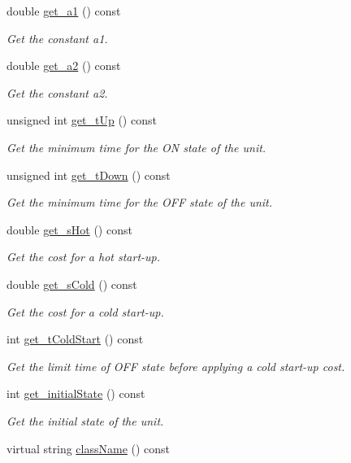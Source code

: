 \begin{DoxyCompactItemize}
double \hyperlink{classeo_u_c_p_unit_a15179a045115082ea193f84cf1c0e971}{get\-\_\-a1} () const 
\begin{DoxyCompactList}\small\item\em \-Get the constant a1. \end{DoxyCompactList}\item 
double \hyperlink{classeo_u_c_p_unit_ac3ea9f83d31ecfca1dcba23d8e4c4f5f}{get\-\_\-a2} () const 
\begin{DoxyCompactList}\small\item\em \-Get the constant a2. \end{DoxyCompactList}\item 
unsigned int \hyperlink{classeo_u_c_p_unit_a0e23ba3e0c819cb5b5031d6d66f37faa}{get\-\_\-t\-Up} () const 
\begin{DoxyCompactList}\small\item\em \-Get the minimum time for the \-O\-N state of the unit. \end{DoxyCompactList}\item 
unsigned int \hyperlink{classeo_u_c_p_unit_a0ab14d553bf956db211fe1a090b687de}{get\-\_\-t\-Down} () const 
\begin{DoxyCompactList}\small\item\em \-Get the minimum time for the \-O\-F\-F state of the unit. \end{DoxyCompactList}\item 
double \hyperlink{classeo_u_c_p_unit_a4a92d564ff6e5fb629a4d2d137dc94fd}{get\-\_\-s\-Hot} () const 
\begin{DoxyCompactList}\small\item\em \-Get the cost for a hot start-\/up. \end{DoxyCompactList}\item 
double \hyperlink{classeo_u_c_p_unit_a858ce079554ef41c13390b01080ced87}{get\-\_\-s\-Cold} () const 
\begin{DoxyCompactList}\small\item\em \-Get the cost for a cold start-\/up. \end{DoxyCompactList}\item 
int \hyperlink{classeo_u_c_p_unit_a38d487e42d5650b6d83fa5552ead7a61}{get\-\_\-t\-Cold\-Start} () const 
\begin{DoxyCompactList}\small\item\em \-Get the limit time of \-O\-F\-F state before applying a cold start-\/up cost. \end{DoxyCompactList}\item 
int \hyperlink{classeo_u_c_p_unit_a9c99c17ffe2f63216b8cf2d8e5ee855b}{get\-\_\-initial\-State} () const 
\begin{DoxyCompactList}\small\item\em \-Get the initial state of the unit. \end{DoxyCompactList}\item 
virtual string \hyperlink{classeo_u_c_p_unit_ab439f2b37301581ce216a365955a045b}{class\-Name} () const 
\end{DoxyCompactItemize}


